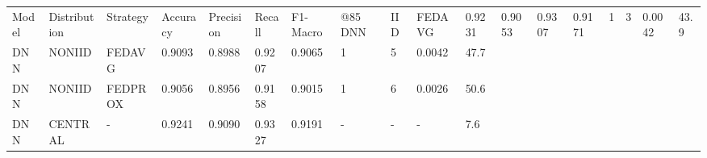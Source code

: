 \begin{tabular}{lllllllllll}
\toprule
Model & Distribution & Strategy & Accuracy & Precision & Recall & F1-Macro & @85%
\midrule
DNN & IID & FEDAVG & 0.9231 & 0.9053 & 0.9307 & 0.9171 & 1 & 3 & 0.0042 & 43.9 \\
DNN & NONIID & FEDAVG & 0.9093 & 0.8988 & 0.9207 & 0.9065 & 1 & 5 & 0.0042 & 47.7 \\
DNN & NONIID & FEDPROX & 0.9056 & 0.8956 & 0.9158 & 0.9015 & 1 & 6 & 0.0026 & 50.6 \\
DNN & CENTRAL & - & 0.9241 & 0.9090 & 0.9327 & 0.9191 & - & - & - & 7.6 \\
\bottomrule
\end{tabular}
